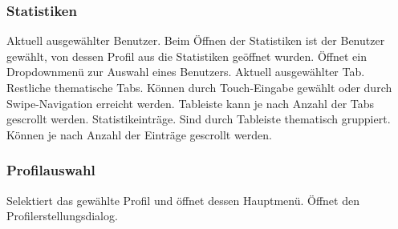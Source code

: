 \subsubsection{Statistiken}
\begin{requirements}
 Aktuell ausgewählter Benutzer. Beim Öffnen der Statistiken ist der Benutzer gewählt, von dessen Profil aus die Statistiken geöffnet wurden. Öffnet ein Dropdownmenü zur Auswahl eines Benutzers.
 Aktuell ausgewählter Tab.
 Restliche thematische Tabs. Können durch Touch-Eingabe gewählt oder durch Swipe-Navigation erreicht werden. Tableiste kann je nach Anzahl der Tabs gescrollt werden.
 Statistikeinträge. Sind durch Tableiste thematisch gruppiert. Können je nach Anzahl der Einträge gescrollt werden.
\end{requirements}

\begin{center}
\setlength\fboxsep{20pt}
\setlength\fboxrule{1pt}
\end{center}

\subsubsection{Profilauswahl}
\begin{requirements}
 Selektiert das gewählte Profil und öffnet dessen Hauptmenü.
 Öffnet den Profilerstellungsdialog.
\end{requirements}

